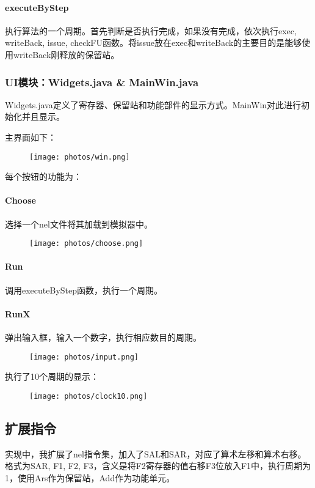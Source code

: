 \documentclass[paper=a4, fontsize=11pt, UTF8]{article} %
\begin{document}
\paragraph{executeByStep}
执行算法的一个周期。首先判断是否执行完成，如果没有完成，依次执行exec, writeBack, issue, checkFU函数。将issue放在exec和writeBack的主要目的是能够使用writeBack刚释放的保留站。

\subsubsection{UI模块：Widgets.java \& MainWin.java}
Widgets.java定义了寄存器、保留站和功能部件的显示方式。MainWin对此进行初始化并且显示。

主界面如下：
\begin{figure}[H]
    \centering
    \texttt{[image: photos/win.png]}
\end{figure}
每个按钮的功能为：
\paragraph{Choose}
选择一个nel文件将其加载到模拟器中。
\begin{figure}[H]
    \centering
    \texttt{[image: photos/choose.png]}
\end{figure}

\paragraph{Run}
调用executeByStep函数，执行一个周期。

\paragraph{RunX}
弹出输入框，输入一个数字，执行相应数目的周期。
\begin{figure}[H]
    \centering
    \texttt{[image: photos/input.png]}
\end{figure}

执行了10个周期的显示：
\begin{figure}[H]
    \centering
    \texttt{[image: photos/clock10.png]}
\end{figure}

\subsection{扩展指令}
实现中，我扩展了nel指令集，加入了SAL和SAR，对应了算术左移和算术右移。格式为SAR, F1, F2, F3，含义是将F2寄存器的值右移F3位放入F1中，执行周期为1，使用Ars作为保留站，Add作为功能单元。
\end{document}
